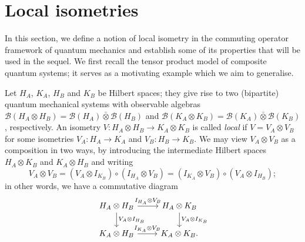 \documentclass[11pt]{amsart}
\theoremstyle{definition}
\newcommand{\cl}[1]{\mathcal{#1}}
\newcommand{\ten}{\otimes}
\begin{document}

\section{Local isometries}
\label{s_locisom}


In this section, we define a notion of local isometry 
in the commuting operator framework of quantum mechanics and 
establish some of its properties that will be used in the sequel. 
We first recall the tensor product model of composite quantum systems; 
it serves as 
a motivating example which we aim to generalise. 

Let $H_A$, $K_A$, $H_B$ and $K_B$ be Hilbert spaces; 
they give rise to two (bipartite) 
quantum mechanical systems with observable
algebras
$\cl B(H_A\ten H_B) = \cl B(H_A)\bar{\otimes}\cl B(H_B)$ and 
$\cl B(K_A\ten K_B) = \cl B(K_A)\bar{\otimes}\cl B(K_B)$, respectively. 
An isometry $V : H_A\ten H_B\to K_A\ten K_B$ is called 
\emph{local} if 
$V = V_A\ten V_B$ for some isometries
$V_A : H_A\to K_A$ and $V_B : H_B\to K_B$.
We may view $V_A\ten V_B$ as a composition 
in two ways, 
by introducing the 
intermediate Hilbert spaces $H_A\ten K_B$ and $K_A\ten H_B$ and writing
$$V_A\ten V_B=(V_A\ten I_{K_B})\circ(I_{H_A}\ten V_B)=(I_{K_A}\ten V_B)\circ(V_A\ten {I_{H_B}});$$ 
in other words, we have a commutative diagram
\begin{equation*}
\begin{tikzcd}
H_A\ten H_B\arrow[d, "V_A\ten I_{H_B}"]\arrow[r, "I_{H_A}\ten V_B"] &H_A\ten K_B\arrow[d, "V_A\ten I_{K_B}"]\\
K_A\ten H_B\arrow[r, "I_{K_A}\ten V_B"] &K_A\ten K_B.
\end{tikzcd}
\end{equation*}
\end{document}
